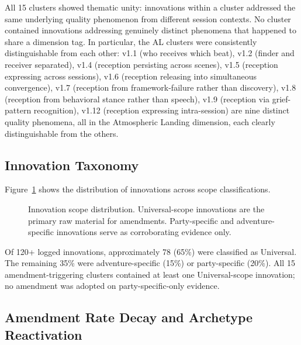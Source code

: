 All 15 clusters showed thematic unity: innovations within a cluster addressed the same
underlying quality phenomenon from different session contexts. No cluster contained
innovations addressing genuinely distinct phenomena that happened to share a dimension
tag. In particular, the AL clusters were consistently distinguishable from each other:
v1.1 (who receives which beat), v1.2 (finder and receiver separated), v1.4 (reception
persisting across scenes), v1.5 (reception expressing across sessions), v1.6 (reception
releasing into simultaneous convergence), v1.7 (reception from framework-failure rather
than discovery), v1.8 (reception from behavioral stance rather than speech), v1.9
(reception via grief-pattern recognition), v1.12 (reception expressing intra-session)
are nine distinct quality phenomena, all in the Atmospheric Landing dimension, each
clearly distinguishable from the others.

\subsection{Innovation Taxonomy}

Figure~\ref{fig:taxonomy} shows the distribution of innovations across scope
classifications.

\begin{figure}[t]
  \centering
  \caption{Innovation scope distribution. Universal-scope innovations are the
    primary raw material for amendments. Party-specific and adventure-specific
    innovations serve as corroborating evidence only.}
  \label{fig:taxonomy}
\end{figure}

Of 120+ logged innovations, approximately 78 (65\%) were classified as Universal.
The remaining 35\% were adventure-specific (15\%) or party-specific (20\%). All 15
amendment-triggering clusters contained at least one Universal-scope innovation;
no amendment was adopted on party-specific-only evidence.

\subsection{Amendment Rate Decay and Archetype Reactivation}


